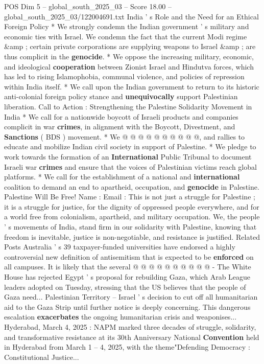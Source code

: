 \begin{textsample}{POS Dim 5 – global\_south\_2025\_03 – Score 18.00 – global\_south\_2025\_03/122004691.txt}
India ' s Role and the Need for an Ethical Foreign Policy * We strongly condemn the Indian government ' s military and economic ties with Israel.
We condemn the fact that the current Modi regime \&amp ; certain private corporations are supplying weapons to Israel \&amp ; are thus complicit in the \textbf{genocide}. * We oppose the increasing military, economic, and ideological \textbf{cooperation} between Zionist Israel and Hindutva forces, which has led to rising Islamophobia, communal violence, and policies of repression within India itself. * We call upon the Indian government to return to its historic anti-colonial foreign policy stance and \textbf{unequivocally} support Palestinian liberation.
Call to Action : Strengthening the Palestine Solidarity Movement in India * We call for a nationwide boycott of Israeli products and companies complicit in war \textbf{crimes}, in alignment with the Boycott, Divestment, and \textbf{Sanctions} ( BDS ) movement. * We @ @ @ @ @ @ @ @ @ @, and rallies to educate and mobilize Indian civil society in support of Palestine. * We pledge to work towards the formation of an \textbf{International} Public Tribunal to document Israeli war \textbf{crimes} and ensure that the voices of Palestinian victims reach global platforms. * We call for the establishment of a national and \textbf{international} coalition to demand an end to apartheid, occupation, and \textbf{genocide} in Palestine.
Palestine Will Be Free!
Name : Email : This is not just a struggle for Palestine ; it is a struggle for justice, for the dignity of oppressed people everywhere, and for a world free from colonialism, apartheid, and military occupation.
We, the people ' s movements of India, stand firm in our solidarity with Palestine, knowing that freedom is inevitable, justice is non-negotiable, and resistance is justified.
Related Posts Australia ' s 39 taxpayer-funded universities have endorsed a highly controversial new definition of antisemitism that is expected to be \textbf{enforced} on all campuses.
It is likely that the several @ @ @ @ @ @ @ @ @ @ - The White House has rejected Egypt ' s proposal for rebuilding Gaza, which Arab League leaders adopted on Tuesday, stressing that the US believes that the people of Gaza need...
Palestinian Territory -- Israel ' s decision to cut off all humanitarian aid to the Gaza Strip until further notice is deeply concerning.
This dangerous escalation \textbf{exacerbates} the ongoing humanitarian crisis and weaponises...
Hyderabad, March 4, 2025 : NAPM marked three decades of struggle, solidarity, and transformative resistance at its 30th Anniversary National \textbf{Convention} held in Hyderabad from March 1 -- 4, 2025, with the theme"Defending Democracy : Constitutional Justice...

\end{textsample}
